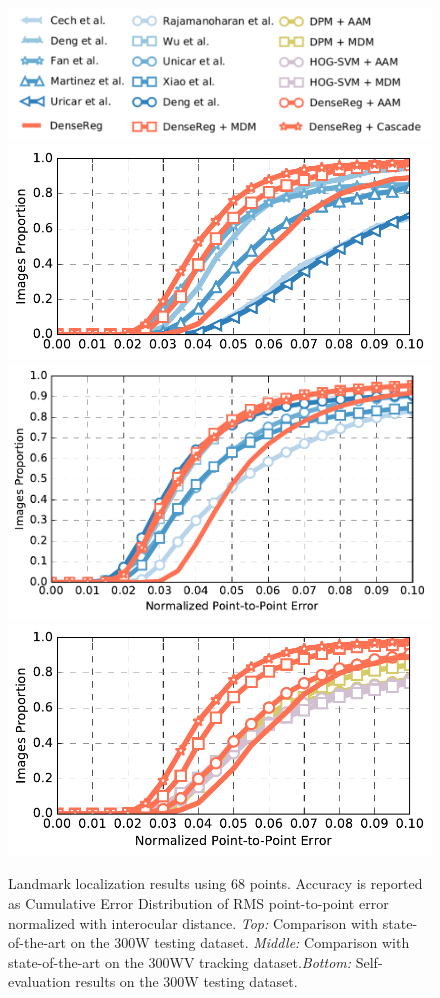 \begin{figure}[!b]
\centering
\includegraphics[width=0.9\linewidth]{resources/Human_Poses/legend_all}
\includegraphics[width=0.9\linewidth]{resources/Human_Poses/300w_68}
\includegraphics[width=0.9\linewidth]{resources/Human_Poses/300vw_all}
\includegraphics[width=0.9\linewidth]{resources/Human_Poses/300w_selfevaluation}
\caption{Landmark localization results using 68 points. Accuracy is reported as Cumulative Error Distribution of RMS point-to-point error normalized with interocular distance. \emph{Top:} Comparison with state-of-the-art on the 300W testing dataset. \emph{Middle:} Comparison with state-of-the-art on the 300WV tracking dataset.\emph{Bottom:} Self-evaluation results on the 300W testing dataset.}
\label{fig:300w}
\end{figure}

